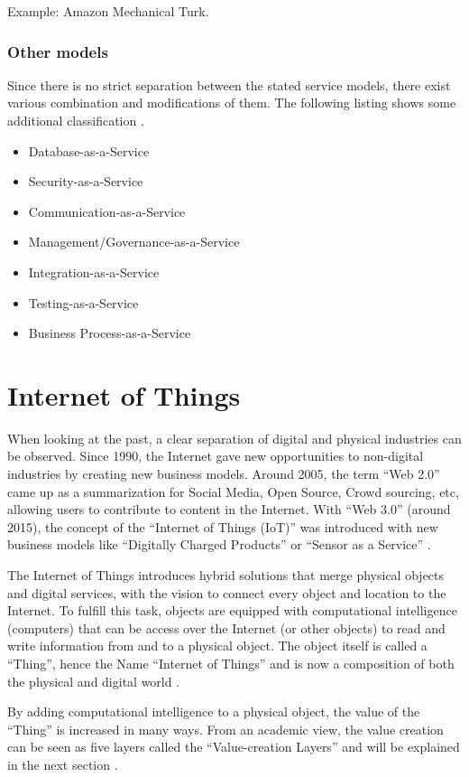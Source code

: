 Example: Amazon Mechanical Turk\cite{huaas}.

\subsubsection{Other models}
Since there is no strict separation between the stated service models, there exist various combination and modifications of them. The following listing shows some additional classification \cite{cloud_characteristics}.
\begin{itemize}
	\item Database-as-a-Service
	\item Security-as-a-Service
	\item Communication-as-a-Service
	\item Management/Governance-as-a-Service
	\item Integration-as-a-Service
	\item Testing-as-a-Service
	\item Business Process-as-a-Service
\end{itemize}

\section{Internet of Things}

When looking at the past, a clear separation of digital and physical industries can be observed. Since 1990, the Internet gave new opportunities to non-digital industries by creating new business models. Around 2005, the term ``Web 2.0'' came up as a summarization for Social Media, Open Source, Crowd sourcing, etc, allowing users to contribute to content in the Internet. With ``Web 3.0'' (around 2015), the concept of the ``Internet of Things (IoT)'' was introduced with new business models like ``Digitally Charged Products'' or ``Sensor as a Service'' \cite{iotfleisch}.

The Internet of Things introduces hybrid solutions that merge physical objects and digital services, with the vision to connect every object and location to the Internet. To fulfill this task, objects are equipped with computational intelligence (computers) that can be access over the Internet (or other objects) to read and write information from and to a physical object. The object itself is called a ``Thing'', hence the Name ``Internet of Things'' and is now a composition of both the physical and digital world \cite{iotfleisch}.

By adding computational intelligence to a physical object, the value of the ``Thing'' is increased in many ways. From an academic view, the value creation can be seen as five layers called the ``Value-creation Layers'' and will be explained in the next section \cite{iotfleisch}.

